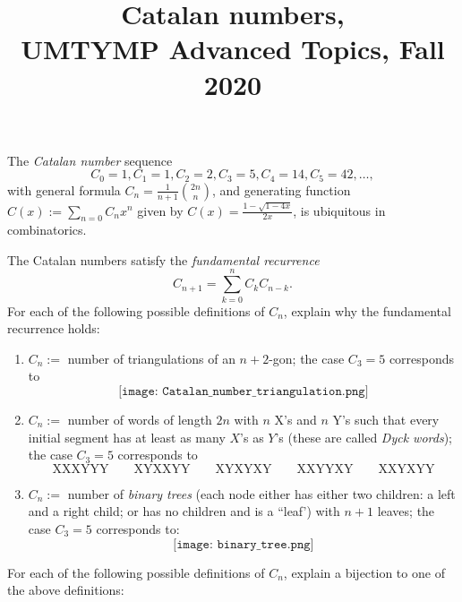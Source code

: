 \documentclass[11pt]{article}
\title{Catalan numbers, \\UMTYMP Advanced Topics, Fall 2020}
\author{}
\date{}
\begin{document}
\maketitle

\vspace{-0.5cm}

The \emph{Catalan number} sequence 
\[C_0=1,C_1=1, C_2=2, C_3=5, C_4=14, C_5=42, \ldots,\] 
with general formula $C_n = \frac{1}{n+1}\binom{2n}{n}$, and generating function $C(x) := \sum_{n=0} C_n x^n$ given by $C(x) = \frac{1-\sqrt{1-4x}}{2x}$, is ubiquitous in combinatorics.

The Catalan numbers satisfy the \emph{fundamental recurrence} 
\[C_{n+1} = \sum_{k=0}^{n}C_k C_{n-k}.\]
 For each of the following possible definitions of $C_n$, explain why the fundamental recurrence holds:

\begin{enumerate}
\item $C_n := $ number of triangulations of an $n+2$-gon; the case $C_3=5$ corresponds to
\[\texttt{[image: Catalan\_number\_triangulation.png]}\]
\item $C_n := $ number of words of length $2n$ with $n$ X's and $n$ Y's such that every initial segment has at least as many $X$'s as $Y$'s (these are called \emph{Dyck words}); the case $C_3=5$ corresponds to
\[\textrm{XXXYYY}  \qquad   \textrm{XYXXYY}  \qquad   \textrm{XYXYXY}  \qquad   \textrm{XXYYXY}  \qquad \textrm{XXYXYY}\]
\item $C_n := $ number of \emph{binary trees} (each node either has either two children: a left and a right child; or has no children and is a ``leaf') with $n+1$ leaves; the case $C_3=5$ corresponds to:
\[\texttt{[image: binary\_tree.png]}\]
\end{enumerate}

\pagebreak

For each of the following possible definitions of $C_n$, explain a bijection to one of the above definitions:
\end{document}
